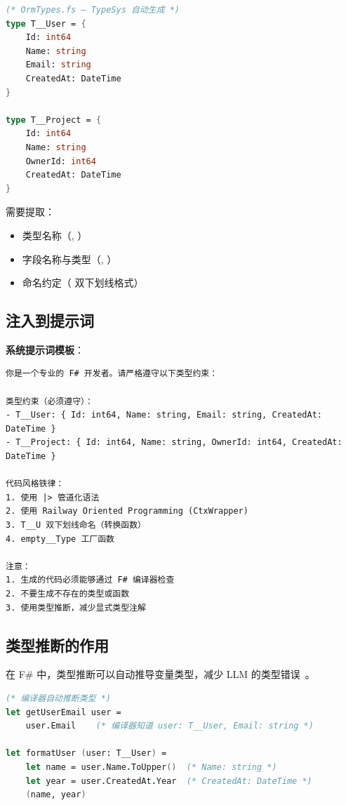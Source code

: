 \documentclass[10pt, openany]{book}
\begin{document}
\begin{example}[F\# 类型定义]
\begin{lstlisting}[language=FSharp]
(* OrmTypes.fs — TypeSys 自动生成 *)
type T__User = {
    Id: int64
    Name: string
    Email: string
    CreatedAt: DateTime
}

type T__Project = {
    Id: int64
    Name: string
    OwnerId: int64
    CreatedAt: DateTime
}
\end{lstlisting}

需要提取：
\begin{itemize}
    \item 类型名称（, ）
    \item 字段名称与类型（, ）
    \item 命名约定（ 双下划线格式）
\end{itemize}
\end{example}

\subsection{注入到提示词}

\begin{framed}
\textbf{系统提示词模板}：
\begin{lstlisting}[style=cmd]
你是一个专业的 F# 开发者。请严格遵守以下类型约束：

类型约束（必须遵守）：
- T__User: { Id: int64, Name: string, Email: string, CreatedAt: DateTime }
- T__Project: { Id: int64, Name: string, OwnerId: int64, CreatedAt: DateTime }

代码风格铁律：
1. 使用 |> 管道化语法
2. 使用 Railway Oriented Programming (CtxWrapper)
3. T__U 双下划线命名（转换函数）
4. empty__Type 工厂函数

注意：
1. 生成的代码必须能够通过 F# 编译器检查
2. 不要生成不存在的类型或函数
3. 使用类型推断，减少显式类型注解
\end{lstlisting}
\end{framed}

\subsection{类型推断的作用}

在 F\# 中，类型推断可以自动推导变量类型，减少 LLM 的类型错误~\cite{Syme2007FSharp}。

\begin{example}[F\# 类型推断]
\begin{lstlisting}[language=FSharp]
(* 编译器自动推断类型 *)
let getUserEmail user =
    user.Email    (* 编译器知道 user: T__User, Email: string *)

let formatUser (user: T__User) =
    let name = user.Name.ToUpper()  (* Name: string *)
    let year = user.CreatedAt.Year  (* CreatedAt: DateTime *)
    (name, year)
\end{lstlisting}
\end{example}
\end{document}
